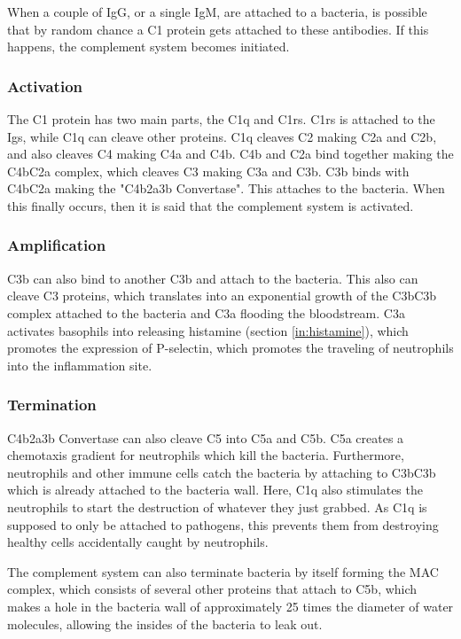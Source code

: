 When a couple of IgG, or a single IgM, are attached to a bacteria, is possible that by random chance a C1 protein gets attached to these antibodies. If this happens, the complement system becomes initiated.

\subsubsection{Activation}

The C1 protein has two main parts, the C1q and C1rs. C1rs is attached to the Igs, while C1q can cleave other proteins. C1q cleaves C2 making C2a and C2b, and also cleaves C4 making C4a and C4b. C4b and C2a bind together making the C4bC2a complex, which cleaves C3 making C3a and C3b. C3b binds with C4bC2a making the "C4b2a3b Convertase". This attaches to the bacteria. When this finally occurs, then it is said that the complement system is activated.

\subsubsection{Amplification}

C3b can also bind to another C3b and attach to the bacteria. This also can cleave C3 proteins, which translates into an exponential growth of the C3bC3b complex attached to the bacteria and C3a flooding the bloodstream. C3a activates basophils into releasing histamine (section \ref{in:histamine}), which promotes the expression of P-selectin, which promotes the traveling of neutrophils into the inflammation site.

\subsubsection{Termination}

C4b2a3b Convertase can also cleave C5 into C5a and C5b. C5a creates a chemotaxis gradient for neutrophils which kill the bacteria. Furthermore, neutrophils and other immune cells catch the bacteria by attaching to C3bC3b which is already attached to the bacteria wall. Here, C1q also stimulates the neutrophils to start the destruction of whatever they just grabbed. As C1q is supposed to only be attached to pathogens, this prevents them from destroying healthy cells accidentally caught by neutrophils.

The complement system can also terminate bacteria by itself forming the MAC complex, which consists of several other proteins that attach to C5b, which makes a hole in the bacteria wall of approximately 25 times the diameter of water molecules, allowing the insides of the bacteria to leak out.

